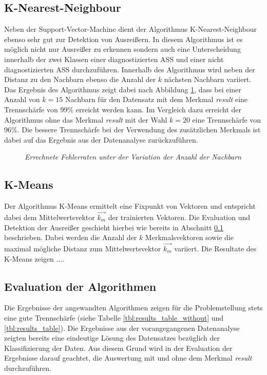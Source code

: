 \documentclass[conference]{IEEEtran}
\begin{document}
\subsection{K-Nearest-Neighbour} \label{sec:kneighbour}
Neben der Support-Vector-Machine dient der Algorithmus K-Nearest-Neighbour ebenso sehr gut zur Detektion von Ausreißern. In diesem Algorithmus ist es möglich nicht nur Ausreißer zu erkennen sondern auch eine Unterscheidung innerhalb der zwei Klassen einer diagnostizierten ASS und einer nicht diagnostizierten ASS durchzuführen. Innerhalb des Algorithmus wird neben der Distanz zu den Nachbarn ebenso die Anzahl der $k$ nächsten Nachbarn variiert.
Das Ergebnis des Algorithmus zeigt dabei nach Abbildung \ref{fig:k_neighbours}, dass bei einer Anzahl von $k=15$ Nachbarn für den Datensatz mit dem Merkmal \textit{result} eine Trennschärfe von 99\% erreicht werden kann. Im Vergleich dazu erreicht der Algorithmus ohne das Merkmal \textit{result} mit der Wahl $k=20$ eine Trennschärfe von 96\%. Die bessere Trennschärfe bei der Verwendung des zusätzlichen Merkmals ist dabei auf das Ergebnis aus der Datenanalyse zurückzuführen.

\begin{figure}[h!]
\centering

\label{fig:k_neighbours}
\caption{\em Errechnete Fehlerraten unter der Variation der Anzahl der Nachbarn}
\end{figure}

\subsection{K-Means}
Der Algorithmus K-Means ermittelt eine Fixpunkt von Vektoren und entspricht dabei dem Mittelwertsvektor $\vec{k_m}$ der trainierten Vektoren. Die Evaluation und Detektion der Ausreißer geschieht hierbei wie bereits in Abschnitt \ref{sec:kneighbour} beschrieben. Dabei werden die Anzahl der $k$ Merkmalsvektoren sowie die maximal mögliche Distanz zum Mittelwertsvektor $\vec{k_m}$ variiert.
Die Resultate des K-Means zeigen ....

\subsection{Evaluation der Algorithmen} \label{sec:evaluation}
Die Ergebnisse der angewandten Algorithmen zeigen für die Problemstellung stets eine gute Trennschärfe (siehe Tabelle \ref{tbl:results_table_without} und \ref{tbl:results_table}). Die Ergebnisse aus der vorangegangenen Datenanalyse zeigten bereits eine eindeutige Lösung des Datensatzes bezüglich der Klassifizierung der Daten. Aus diesem Grund wird in der Evaluation der Ergebnisse darauf geachtet, die Auswertung mit und ohne dem Merkmal \textit{result} durchzuführen.
\end{document}
